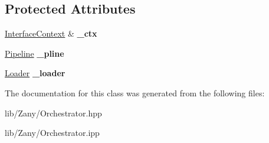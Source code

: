 \subsection*{Protected Attributes}
\begin{DoxyCompactItemize}
\item 
\mbox{\label{classzany_1_1_orchestrator_a015e9b4064aa6cf681db3bbb9e68dc29}} 
\hyperlink{classzany_1_1_interface_context}{Interface\+Context} \& {\bfseries \+\_\+ctx}
\item 
\mbox{\label{classzany_1_1_orchestrator_a7f3cccf4f3f16594580150d598a2c3c8}} 
\hyperlink{classzany_1_1_pipeline}{Pipeline} {\bfseries \+\_\+pline}
\item 
\mbox{\label{classzany_1_1_orchestrator_af3690067cfa4d3fd89e0d5b8a78817af}} 
\hyperlink{classzany_1_1_loader}{Loader} {\bfseries \+\_\+loader}
\end{DoxyCompactItemize}


The documentation for this class was generated from the following files\+:\begin{DoxyCompactItemize}
\item 
lib/\+Zany/Orchestrator.\+hpp\item 
lib/\+Zany/Orchestrator.\+ipp\end{DoxyCompactItemize}
